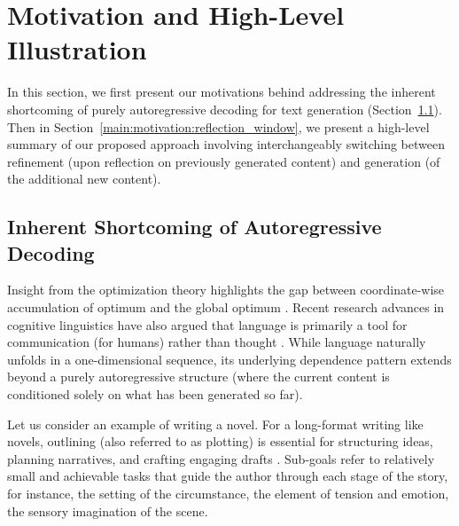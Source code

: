 \section{Motivation and High-Level Illustration}\label{main:motivation}
In this section, we first present our motivations behind addressing the inherent shortcoming of purely autoregressive decoding for text generation (Section~\ref{main:motivation:issue}).
Then in Section~\ref{main:motivation:reflection_window}, we present a high-level summary of our proposed approach involving interchangeably switching between refinement (upon reflection on previously generated content) and generation (of the additional new content).


\subsection{Inherent Shortcoming of Autoregressive Decoding}\label{main:motivation:issue}
Insight from the optimization theory highlights the gap between coordinate-wise accumulation of optimum and the global optimum \citep{torn1989global,nocedal1999numerical}.
Recent research advances in cognitive linguistics have also argued that language is primarily a tool for communication (for humans) rather than thought \citep{fedorenko2024language}.
While language naturally unfolds in a one-dimensional sequence, its underlying dependence pattern extends beyond a purely autoregressive structure (where the current content is conditioned solely on what has been generated so far).

Let us consider an example of writing a novel.
For a long-format writing like novels, outlining (also referred to as plotting) is essential for structuring ideas, planning narratives, and crafting engaging drafts \citep{king2000writing,serravallo2017writing}.
Sub-goals refer to relatively small and achievable tasks that guide the author through each stage of the story, for instance, the setting of the circumstance, the element of tension and emotion, the sensory imagination of the scene.

